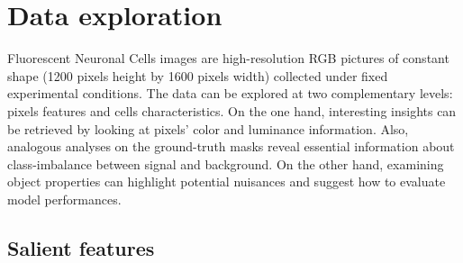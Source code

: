 \section{Data exploration}
\label{sec:data_exploration}

Fluorescent Neuronal Cells images are high-resolution RGB pictures of constant shape (1200 pixels height by 1600 pixels width) collected under fixed experimental conditions.
The data can be explored at two complementary levels: pixels features and cells characteristics. 
On the one hand, interesting insights can be retrieved by looking at pixels' color and luminance information. Also, analogous analyses on the ground-truth masks reveal essential information about class-imbalance between signal and background.
On the other hand, examining object properties can highlight potential nuisances and suggest how to evaluate model performances.

\subsection{Salient features}
\label{sec:data_features}

